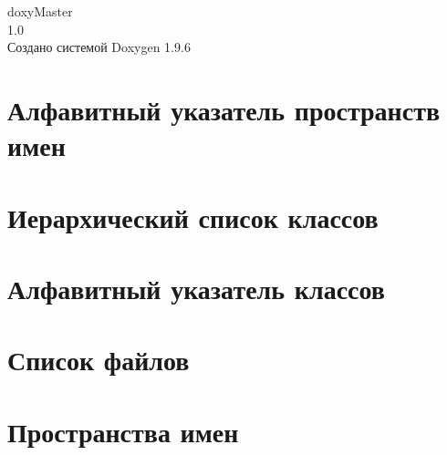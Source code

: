 \documentclass[twoside]{book}
\newcommand{\+}{\discretionary{\mbox{\scriptsize$\hookleftarrow$}}{}{}}
\newcommand{\clearemptydoublepage}{%
    \newpage{\pagestyle{empty}\cleardoublepage}%
  }
\begin{document}
  \raggedbottom
  \begin{titlepage}
  \vspace*{7cm}
  \begin{center}%
  {\Large doxy\+Master}\\
  [1ex]\large 1.\+0 \\
  \vspace*{1cm}
  {\large Создано системой Doxygen 1.9.6}\\
  \end{center}
  \end{titlepage}
  \clearemptydoublepage
  \tableofcontents
  \clearemptydoublepage
\chapter{Алфавитный указатель пространств имен}

\chapter{Иерархический список классов}

\chapter{Алфавитный указатель классов}

\chapter{Список файлов}

\chapter{Пространства имен}

\end{document}
